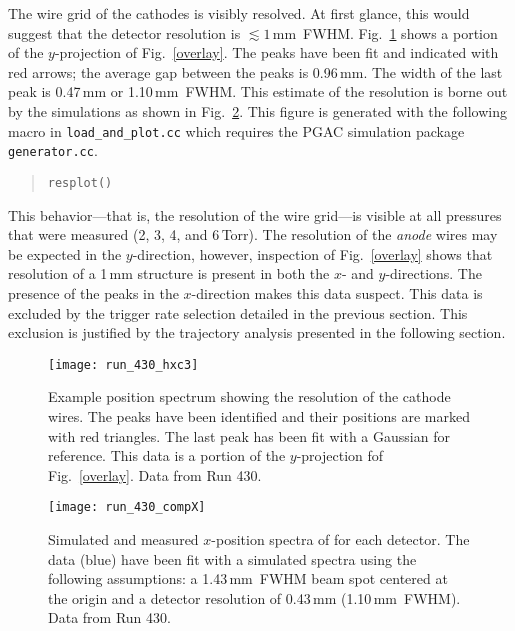 The wire grid of the cathodes is visibly resolved.  %
At first glance, this  would suggest that the detector resolution is $\lesssim 1$\,mm~FWHM. 
Fig.~\ref{peaks} shows a portion of the $y$-projection of Fig.~\ref{overlay}. The peaks have been fit and indicated with red arrows; the average gap between the peaks is 0.96\,mm. The width of the last peak is 0.47\,mm or 1.10\,mm~FWHM. This estimate of the resolution is borne out by the simulations as shown in Fig.~\ref{sim_comp2}. This figure is generated with the following macro in \texttt{load\_and\_plot.cc} which requires the PGAC simulation package \texttt{generator.cc}.
\vsetroot
\begin{quote}
\begin{Verbatim}[firstnumber=0]
resplot()
\end{Verbatim}
\end{quote}
\vsetnone
This behavior---that is, the resolution of the wire grid---is %
 visible at all pressures that were measured (2, 3, 4, and 6\,Torr). %
The resolution of the \textit{anode} wires may be expected in the $y$-direction, however, inspection of Fig.~\ref{overlay} shows that resolution of a 1\,mm structure is present in both the $x$- and $y$-directions. The presence of the peaks in the $x$-direction makes this data suspect. This data is excluded by the trigger rate selection detailed in the previous section. This exclusion is justified by the trajectory analysis presented in the following section.
\begin{figure}
\centering
\texttt{[image: run\_430\_hxc3]}%
\caption{Example position spectrum showing the resolution of the cathode wires. The peaks have been identified and their positions are marked with red triangles. The last peak has been fit with a Gaussian for reference. This data is a portion of the $y$-projection ƒof Fig.~\ref{overlay}. Data from Run 430.}%
\label{peaks}%
\end{figure}

\begin{figure}%
\centering
\texttt{[image: run\_430\_compX]}%
\caption{Simulated and measured $x$-position spectra of for each detector. The data (blue) have been fit with a simulated spectra using the following assumptions: a 1.43\,mm~FWHM beam spot centered at the origin and a detector resolution of 0.43\,mm (1.10\,mm~FWHM). Data from Run 430.}%
\label{sim_comp2}%
\end{figure}
